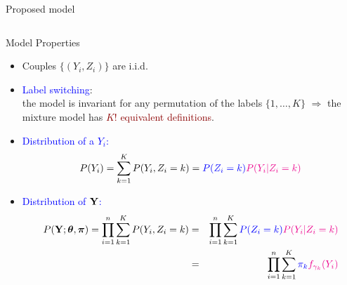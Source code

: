 \documentclass{beamer}\usepackage[]{graphicx}\usepackage[]{color}
\newcommand{\blue}[1]{\textcolor{blue}{#1}}
\newcommand{\emphase}[1]{\textcolor{darkred}{#1}}
\newcommand{\Ybf}{{\bf Y}}
\newcommand{\pibf}{\mbox{\mathversion{bold}{$\pi$}}}
\newcommand{\thetabf}{\mbox{\mathversion{bold}{$\theta$}}}
\begin{document}
\begin{frame}[fragile]{Proposed model}
\begin{columns}
\begin{column}{0.45\textwidth}
  \end{column}
  \end{columns}
\end{frame}

\begin{frame}[fragile]{Model Properties}
\begin{itemize}
\item Couples $\{(Y_i, Z_i)\}$ are i.i.d.
\item \blue{Label switching}:\\ the model is invariant for any permutation of the labels $\{1,
  \dots, K\}$ $\Rightarrow$ the mixture model has \emphase{$K!$
    equivalent definitions}.
\item\blue{Distribution of a $Y_i$:}\\
$$P(Y_i)=\sum_{k=1}^K P(Y_i, Z_i=k)=\textcolor{blue}{P(Z_i=k)} \textcolor{magenta}{P(Y_i | Z_i=k)} $$
\item\blue{Distribution of $\Ybf$:}\\
{\small
\begin{eqnarray*}
P(\Ybf ; \thetabf, \pibf)= \prod_{i=1}^n \sum_{k=1}^K P(Y_i , Z_i=k)  
&=& \prod_{i=1}^n \sum_{k=1}^K \textcolor{blue}{P(Z_i=k)} \textcolor{magenta}{P(Y_i | Z_i=k)} \\ 
&=& \prod_{i=1}^n \sum_{k=1}^K \textcolor{blue}{\pi_k} \textcolor{magenta}{f_{\gamma_k}(Y_i)} 
\end{eqnarray*}
}
\end{itemize}
\end{frame}
\end{document}
